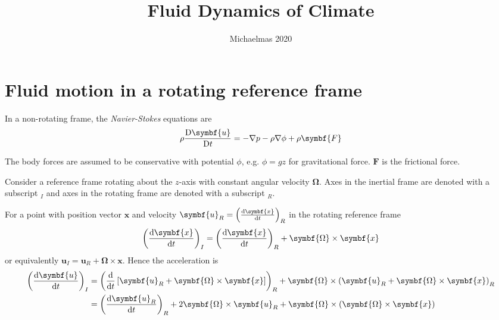\documentclass{jknotes}
\begin{document}
\title{Fluid Dynamics of Climate}
\date{Michaelmas 2020}

\maketitle
\suggestionsspiel
\tableofcontents

\section{Fluid motion in a rotating reference frame}
In a non-rotating frame, the \emph{Navier-Stokes} equations are
\begin{equation}
	\rho \frac{\diffD \symbf{u}}{\diffD t} = -\nabla p - \rho \nabla \phi + \rho
	\symbf{F}
	\label{ns}
\end{equation}

The body forces are assumed to be conservative with potential $\phi$, e.g.
$\phi = gz$ for gravitational force. $\symbf{F}$ is the frictional force.

Consider a reference frame rotating about the $z$-axis with constant angular
velocity $\symbf{\Omega}$. Axes in the inertial frame are denoted with a
subscript $_I$ and axes in the rotating frame are denoted with a subscript
$_R$.

\begin{center}

\end{center}

For a point with position vector $\symbf{x}$ and velocity $\symbf{u}_R =
\left(\frac{\diffd \symbf{x}}{\diffd t}\right)_R$ in the rotating reference
frame
\begin{equation}
	\left(\frac{\diffd \symbf{x}}{\diffd t}\right)_I = 
	\left(\frac{\diffd \symbf{x}}{\diffd t}\right)_R + \symbf{\Omega} \times \symbf{x}
\end{equation}
or equivalently $\symbf{u}_I = \symbf{u}_R + \symbf{\Omega} \times \symbf{x}$. Hence the
acceleration is
\begin{equation}
	\begin{aligned}
		\left(\frac{\diffd \symbf{u}}{\diffd t}\right)_I &= 
	\left(\frac{\diffd}{\diffd t}\left[ \symbf{u}_R + \symbf{\Omega} \times \symbf{x}
			\right]\right)_R + \symbf{\Omega} \times \left( \symbf{u}_R +
		\symbf{\Omega} \times \symbf{x}\right)_R \\
		&= \left(\frac{\diffd \symbf{u}_R}{\diffd t}\right)_R + 2 \symbf{\Omega}
		\times \symbf{u}_R + \symbf{\Omega} \times \left( \symbf{\Omega} \times
		\symbf{x}\right)
	\end{aligned}
\end{equation}
\end{document}
